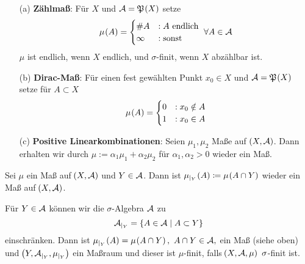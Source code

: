 \documentclass[skript.tex]{subfiles}
\begin{document}
	\begin{bsp}
		\hfill
		\begin{itemize}
			\item[(a)] \textbf{Zählmaß}: Für $X$ und $\mc{A}=\mf{P}\pr{X}$ setze 
				\begin{equation*}
					\mu\pr{A} = 
					\begin{cases}
						\#A &: A \text{ endlich}\\
						\infty &: \text{sonst}
					\end{cases}\ \forall A\in\mc{A}
				\end{equation*}
				$\mu$ ist endlich, wenn $X$ endlich, und $\sigma$-finit, wenn $X$ abzählbar ist.
				
			\item[(b)] \textbf{Dirac-Maß}: Für einen fest gewählten Punkt $x_0 \in X$ und $\mc{A}=\mf{P}\pr{X}$ setze für $A \subset X$
				\begin{equation*}
					\mu\pr{A} = 
						\begin{cases}
							0 &: x_0 \notin A\\
							1 &: x_0 \in A
						\end{cases}
				\end{equation*}
			
			\item[(c)] \textbf{Positive Linearkombinationen}: Seien $\mu_1, \mu_2$ Maße auf $\pr{X, \mc{A}}$. Dann erhalten wir durch $\mu:= \alpha_1\mu_1 + \alpha_2\mu_2$ für $\alpha_1, \alpha_2 > 0$ wieder ein Maß. 
		\end{itemize}
	\end{bsp}

	\begin{bsp}
		Sei $\mu$ ein Maß auf $\pr{X,\mc{A}}$ und $Y\in\mathcal{A}$. Dann ist $\mu_{|_{Y}}\pr{A} \coloneqq \mu\pr{A\cap Y}$ wieder ein Maß auf $\pr{X, \mc{A}}$. 
	\end{bsp}
	
	\begin{bem*}
		Für $Y \in \mathcal{A}$ können wir die $\sigma$-Algebra $\mathcal{A}$ zu 
		\begin{equation*}
			\mathcal{A}_{|_{Y}} = \left\{A \in \mathcal{A} \mid A \subset Y\right\}
		\end{equation*}
		einschränken. Dann ist $\mu_{|_Y}\pr{A} = \mu\pr{A\cap Y},\ A\cap Y \in \mc{A},$ ein Maß (siehe oben) und $\pr{Y,\mc{A}_{|_Y},\mu_{|_Y}}$ ein Maßraum und dieser ist $\mu$-finit, falls $\pr{X,\mc{A},\mu}\ \sigma$-finit ist. 
	\end{bem*}
	
\end{document}
